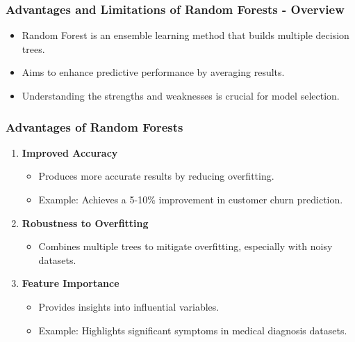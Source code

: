 \documentclass[aspectratio=169]{beamer}
\begin{document}
\begin{frame}[fragile]
    \frametitle{Advantages and Limitations of Random Forests - Overview}
    \begin{itemize}
        \item Random Forest is an ensemble learning method that builds multiple decision trees.
        \item Aims to enhance predictive performance by averaging results.
        \item Understanding the strengths and weaknesses is crucial for model selection.
    \end{itemize}
\end{frame}

\begin{frame}[fragile]
    \frametitle{Advantages of Random Forests}
    \begin{enumerate}
        \item \textbf{Improved Accuracy}
            \begin{itemize}
                \item Produces more accurate results by reducing overfitting.
                \item Example: Achieves a 5-10\% improvement in customer churn prediction.
            \end{itemize}
        \item \textbf{Robustness to Overfitting}
            \begin{itemize}
                \item Combines multiple trees to mitigate overfitting, especially with noisy datasets.
            \end{itemize}
        \item \textbf{Feature Importance}
            \begin{itemize}
                \item Provides insights into influential variables.
                \item Example: Highlights significant symptoms in medical diagnosis datasets.
            \end{itemize}
    \end{enumerate}
\end{frame}
\end{document}
